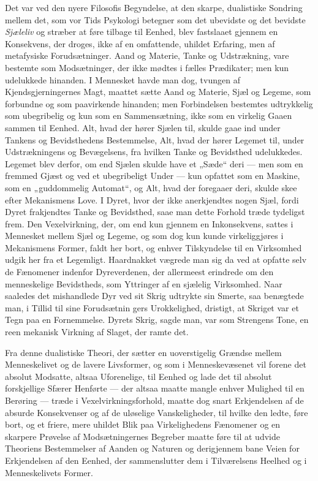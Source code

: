 \documentclass[12pt,a4paper,openany]{book}
\newcommand{\opage}[1]{\marginnote{\footnotesize\textit{[#1]}}}
\begin{document}
Det var ved den nyere Filosofis Begyndelse, at den
skarpe, dualistiske Sondring mellem det, som vor Tids Psykologi
betegner som det ubevidste og det bevidste \emph{Sjæleliv}
og stræber at føre tilbage til Eenhed, blev fastslaaet gjennem
en Konsekvens, der droges, ikke af en omfattende, uhildet
Erfaring, men af metafysiske Forudsætninger. Aand og
Materie, Tanke og Udstrækning, vare bestemte som Modsætninger,
der ikke mødtes i fælles Prædikater; men kun
udelukkede hinanden. I Mennesket havde man dog, tvungen
af Kjendsgjerningernes Magt, maattet sætte Aand og Materie,
Sjæl og Legeme, som forbundne og som paavirkende hinanden;
men Forbindelsen bestemtes udtrykkelig som ubegribelig og
kun som en Sammensætning, ikke som en virkelig Gaaen
sammen til Eenhed. Alt, hvad der hører Sjælen til, skulde
gaae ind under Tankens og Bevidsthedens Bestemmelse, Alt,
hvad der hører Legemet til, under Udstrækningens og Bevægelsens,
fra hvilken Tanke og Bevidsthed udelukkedes. Legemet
blev derfor, om end Sjælen skulde have et „Sæde“ deri ---
men som en fremmed Gjæst og ved et ubegribeligt Under ---
kun opfattet som en Maskine, som en „guddommelig Automat“,
og Alt, hvad der foregaaer deri, skulde skee efter Mekanismens
Love. I Dyret, hvor der ikke anerkjendtes nogen Sjæl,
fordi Dyret frakjendtes Tanke og Bevidsthed, saae man dette
Forhold træde tydeligst frem. Den Vexelvirkning, der, om
end kun gjennem en Inkonsekvens, sattes i Mennesket mellem
Sjæl og Legeme, og som dog kun kunde virkeliggjøres i
Mekanismens Former, faldt her bort, og enhver Tilskyndelse
til en Virksomhed udgik her fra et Legemligt. Haardnakket
vægrede man sig da ved at opfatte selv de Fænomener indenfor
Dyreverdenen, der allermeest erindrede om den menneskelige
Bevidstheds, som Yttringer af en sjælelig Virksomhed. Naar
saaledes det mishandlede Dyr ved sit Skrig udtrykte sin
Smerte, saa benægtede man, i Tillid til sine Forudsætnin%
\opage{44}gers Urokkelighed, dristigt, at Skriget var et Tegn paa en
Fornemmelse. Dyrets Skrig, sagde man, var som Strengens
Tone, en reen mekanisk Virkning af Slaget, der ramte det.

Fra denne dualistiske Theori, der sætter en uoverstigelig
Grændse mellem Menneskelivet og de lavere Livsformer, og
som i Menneskevæsenet vil forene det absolut Modsatte, altsaa
Uforenelige, til Eenhed og lade det til absolut forskjellige
Sfærer Henførte --- der altsaa maatte mangle enhver Mulighed
til en Berøring --- træde i Vexelvirkningsforhold, maatte dog
snart Erkjendelsen af de absurde Konsekvenser og af de
uløselige Vanskeligheder, til hvilke den ledte, føre bort, og et
friere, mere uhildet Blik paa Virkelighedens Fænomener og
en skarpere Prøvelse af Modsætningernes Begreber maatte
føre til at udvide Theoriens Bestemmelser af Aanden og
Naturen og derigjennem bane Veien for Erkjendelsen af den
Eenhed, der sammenslutter dem i Tilværelsens Heelhed og
i Menneskelivets Former.
\end{document}
